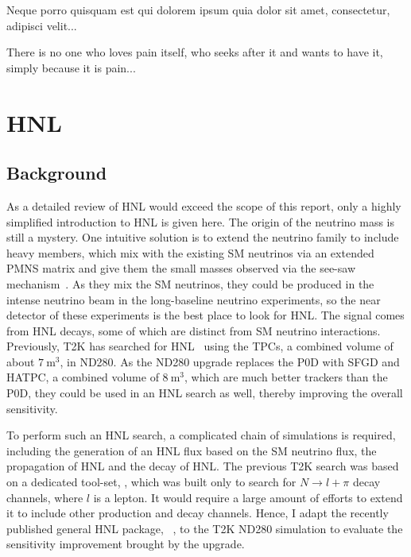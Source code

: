 \begin{savequote}[8cm]
\textlatin{Neque porro quisquam est qui dolorem ipsum quia dolor sit amet, consectetur, adipisci velit...}

There is no one who loves pain itself, who seeks after it and wants to have it, simply because it is pain...
\end{savequote}

\chapter{\label{ch:hnl}HNL} 

\minitoc

    \section{Background}
        As a detailed review of HNL would exceed the scope of this report, only a highly simplified introduction to HNL is given here. 
        The origin of the neutrino mass is still a mystery. 
        One intuitive solution is to extend the neutrino family to include heavy members, which mix with the existing SM neutrinos via an extended PMNS matrix and give them the small masses observed via the see-saw mechanism~\cite{Abada:2007ux}. 
        As they mix the SM neutrinos, they could be produced in the intense neutrino beam in the long-baseline neutrino experiments, so the near detector of these experiments is the best place to look for HNL. 
        The signal comes from HNL decays, some of which are distinct from SM neutrino interactions. 
        Previously, T2K has searched for HNL~\cite{T2K:2019jwa} using the TPCs, a combined volume of about $7~\textrm{m}^3$, in ND280. As 
        the ND280 upgrade replaces the P0D with SFGD and HATPC, a combined volume of $8~\textrm{m}^3$, which are much better trackers than the P0D, they could be used in an HNL search as well, thereby improving the overall sensitivity. 

        To perform such an HNL search, a complicated chain of simulations is required, including the generation of an HNL flux based on the SM neutrino flux, the propagation of HNL and the decay of HNL. 
        The previous T2K search was based on a dedicated tool-set, , which was built only to search for $N\rightarrow l + \pi$ decay channels, where $l$ is a lepton. 
        It would require a large amount of efforts to extend it to include other production and decay channels. 
        Hence, I adapt the recently published general HNL package, ~\cite{Plows:2022gxc}, to the T2K ND280 simulation to evaluate the sensitivity improvement brought by the upgrade.

